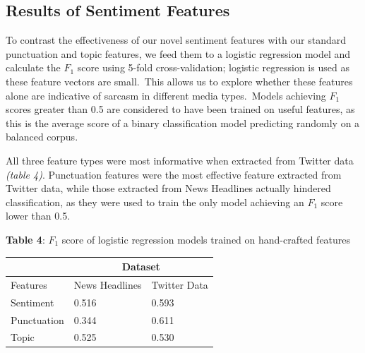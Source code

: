 \documentclass[12pt,a4paper]{article}
\begin{document}
\subsection{Results of Sentiment Features}\vspace{-5pt}
\noindent To contrast the effectiveness of our novel sentiment features with our standard punctuation and topic features, we feed them to a logistic regression model and calculate the $F_1$ score using 5-fold cross-validation; logistic regression is used as these feature vectors are small.\ This allows us to explore whether these features alone are indicative of sarcasm in different media types.\ Models achieving $F_1$ scores greater than 0.5 are considered to have been trained on useful features, as this is the average score of a binary classification model predicting randomly on a balanced corpus.\\\vspace{-5pt}


\hspace{-18pt}\begin{minipage}{0.46\textwidth}
	\noindent All three feature types were most informative when extracted from Twitter data \textit{(table 4)}. Punctuation features were the most effective feature extracted from Twitter data, while those extracted from News Headlines actually hindered classification, as they were used to train the only model achieving an $F_1$ score lower than 0.5.
\end{minipage}\vspace{8pt}\hspace{10pt}
\begin{minipage}{0.50\textwidth}
	\begin{center}
		\noindent \textbf{Table 4}: $F_1$ score of logistic regression models trained on hand-crafted features\vspace{5pt}
		\begin{tabular}{|p{2cm}||p{2.8cm}|p{2.2cm}|}
			\hline
			& \multicolumn{2}{c|}{Dataset} \\
			\hline
			Features & News Headlines & Twitter Data\\
			\hline\hline
			Sentiment & 0.516 & 0.593\\
			\hline
			Punctuation & 0.344 & 0.611\\
			\hline
			Topic & 0.525 & 0.530\\
			\hline
		\end{tabular}
	\end{center}	
\end{minipage}
\end{document}
